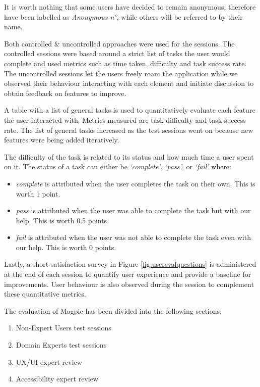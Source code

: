It is worth nothing that some users have decided to remain anonymous, therefore have
been labelled as \emph{Anonymous n°}, while others will be referred to by their
name.

\newpage{}

\noindent Both controlled \& uncontrolled approaches were used for the sessions.
The controlled sessions were based around a strict list of tasks the user would
complete and used metrics such as time taken, difficulty and task success rate.
The uncontrolled sessions let the users freely roam the application while we
observed their behaviour interacting with each element and initiate discussion
to obtain feedback on features to improve.

\noindent A table with a list of general tasks is used to quantitatively
evaluate each feature the user interacted with. Metrics measured are task
difficulty and task success rate. The list of general tasks increased as the
test sessions went on because new features were being added iteratively.

The difficulty of the task is related to its status and how much time a user
spent on it. The status of a task can either be \emph{`complete'},
\emph{`pass'}, or \emph{`fail'} where:

\begin{itemize}
    \item \emph{complete} is attributed when the user completes the task on
          their own. This is worth 1 point.
    \item \emph{pass} is attributed when the user was able to complete the task
          but with our help. This is worth 0.5 points.
    \item \emph{fail} is attributed when the user was not able to complete the
          task even with our help. This is worth 0 points.
\end{itemize}

Lastly, a short satisfaction survey in Figure \ref{fig:userevalquestions} is
administered at the end of each session to quantify user experience and provide
a baseline for improvements. User behaviour is also observed during the session
to complement these quantitative metrics.

The evaluation of Magpie has been divided into the following sections:
\begin{enumerate}
    \item Non-Expert Users test sessions
    \item Domain Experts test sessions
    \item UX/UI expert review
    \item Accessibility expert review
\end{enumerate}

